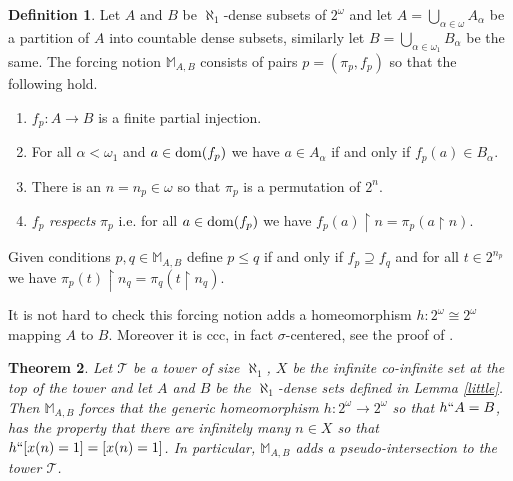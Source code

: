 \documentclass[leqno,11pt]{amsart}
\newtheorem{theorem}{Theorem}[section]
\theoremstyle{definition}
\newtheorem{definition}[theorem]{Definition}
\theoremstyle{remark}
\def\hook{\upharpoonright}
\def\cantor{2^\omega}
\begin{document}
\begin{definition}
    Let $A$ and $B$ be $\aleph_1$-dense subsets of $\cantor$ and let $A = \bigcup_{\alpha\in \omega} A_\alpha$ be a partition of $A$ into countable dense subsets, similarly let $B = \bigcup_{\alpha \in \omega_1} B_\alpha$ be the same. The forcing notion $\mathbb M_{A, B}$ consists of pairs $p = (\pi_p, f_p)$ so that the following hold.
    \begin{enumerate}
        \item $f_p:A \to B$ is a finite partial injection.
        \item For all $\alpha < \omega_1$ and $a \in {\rm dom}(f_p)$ we have $a \in A_\alpha$ if and only if $f_p(a) \in B_\alpha$. 
        \item There is an $n = n_p \in \omega$ so that $\pi_p$ is a permutation of $2^n$. 
        \item $f_p$ {\em respects} $\pi_p$ i.e. for all $a \in {\rm dom}(f_p)$ we have $f_p(a) \hook n = \pi_p(a \hook n)$. 
    \end{enumerate}
    Given conditions $p, q \in \mathbb M_{A, B}$ define $p \leq q$ if and only if $f_p \supseteq f_q$ and for all $t \in 2^{n_p}$ we have $\pi_p(t) \hook n_q = \pi_q(t\hook n_q)$. 
\end{definition}

It is not hard to check this forcing notion adds a homeomorphism $h:\cantor \cong \cantor$ mapping $A$ to $B$. Moreover it is ccc, in fact $\sigma$-centered, see the proof of \cite[Theorem 2.1]{Medini15}. 

\begin{theorem}
    Let $\mathcal T$ be a tower of size $\aleph_1$, $X$ be the infinite co-infinite set at the top of the tower and let $A$ and $B$ be the $\aleph_1$-dense sets defined in Lemma \ref{little}. Then $\mathbb M_{A, B}$ forces that the generic homeomorphism $h:\cantor \to \cantor$ so that $h``A = B$, has the property that there are infinitely many $n\in X$ so that $h``[x(n)=1] = [x(n)=1]$. In particular, $\mathbb M_{A, B}$ adds a pseudo-intersection to the tower $\mathcal T$.
\end{theorem}
\end{document}
